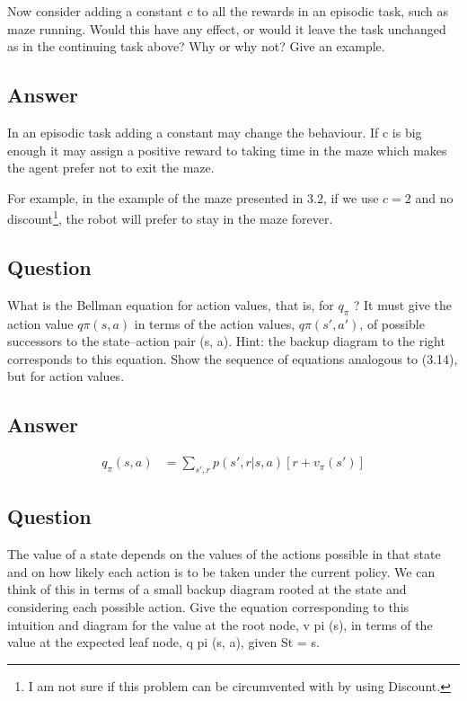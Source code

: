 \documentclass[11pt]{article}
\begin{document}
    Now consider adding a constant c to all the rewards in an episodic task, such as maze running.
    Would this have any effect, or would it leave the task unchanged as in the continuing task above?
    Why or why not?
    Give an example.

    \subsection*{Answer}

    In an episodic task adding a constant may change the behaviour.
    If c is big enough it may assign a positive reward to taking time in the maze which makes the agent prefer not to exit the maze. 

    For example, in the example of the maze presented in $3.2$, if we use $c = 2$ and no discount\footnote{I am not sure if this problem can be circumvented with by using Discount.}, the robot will prefer to stay in the maze forever.

    \subsection{Question}

    What is the Bellman equation for action values, that is, for $q_\pi$ ?
    It must give the action value $q\pi(s, a)$ in terms of the action values, $q\pi(s', a')$, of possible successors to the state–action pair (s, a).
    Hint: the backup diagram to the right corresponds to this equation.
    Show the sequence of equations analogous to (3.14), but for action values.

    \subsection*{Answer}

    \begin{align*}
        q_\pi(s, a) & =  \sum_{s', r} p(s', r|s, a) [r + v_\pi(s')]
    \end{align*}

    \subsection{Question}

   The value of a state depends on the values of the actions possible in that state and on how likely each action is to be taken under the current policy.
    We can think of this in terms of a small backup diagram rooted at the state and considering each possible action.
    Give the equation corresponding to this intuition and diagram for the value at the root node, v pi (s), in terms of the value at the expected leaf node, q pi (s, a), given St = s.
\end{document}

